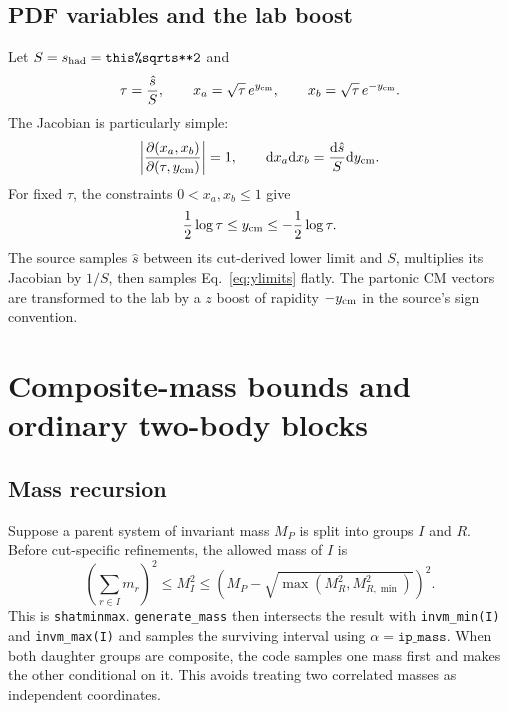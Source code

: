 \documentclass[11pt,a4paper]{article}
\newcommand{\shat}{\hat{s}}
\newcommand{\dd}{\mathrm{d}}
\newcommand{\code}[1]{\texttt{#1}}
\begin{document}
\subsection{PDF variables and the lab boost}

Let $S=s_{\rm had}=\code{this\%sqrts**2}$ and
\begin{equation}
 \tau=\frac{\shat}{S},\qquad
 x_a=\sqrt\tau\,e^{y_{\rm cm}},\qquad
 x_b=\sqrt\tau\,e^{-y_{\rm cm}} .
 \label{eq:tauy}
\end{equation}
The Jacobian is particularly simple:
\begin{equation}
 \left|\frac{\partial(x_a,x_b)}{\partial(\tau,y_{\rm cm})}\right|=1,
 \qquad \dd x_a\dd x_b=\frac{\dd\shat}{S}\dd y_{\rm cm} .
 \label{eq:pdfjac}
\end{equation}
For fixed $\tau$, the constraints $0<x_a,x_b\le1$ give
\begin{equation}
 \frac12\log\tau\le y_{\rm cm}\le-\frac12\log\tau .
 \label{eq:ylimits}
\end{equation}
The source samples $\shat$ between its cut-derived lower limit and $S$,
multiplies its Jacobian by $1/S$, then samples Eq.~\eqref{eq:ylimits} flatly.
The partonic CM vectors are transformed to the lab by a $z$ boost of rapidity
$-y_{\rm cm}$ in the source's sign convention.

\section{Composite-mass bounds and ordinary two-body blocks}

\subsection{Mass recursion}

Suppose a parent system of invariant mass $M_P$ is split into groups $I$ and
$R$.  Before cut-specific refinements, the allowed mass of $I$ is
\begin{equation}
 \left(\sum_{r\in I}m_r\right)^2
 \le M_I^2\le
 \left(M_P-\sqrt{\max(M_R^2,M_{R,\min}^2)}\right)^2 .
 \label{eq:massbounds}
\end{equation}
This is \code{shatminmax}.  \code{generate\_mass} then intersects the result
with \code{invm\_min(I)} and \code{invm\_max(I)} and samples the surviving
interval using $\alpha=\code{ip\_mass}$.  When both daughter groups are
composite, the code samples one mass first and makes the other conditional on
it.  This avoids treating two correlated masses as independent coordinates.
\end{document}
